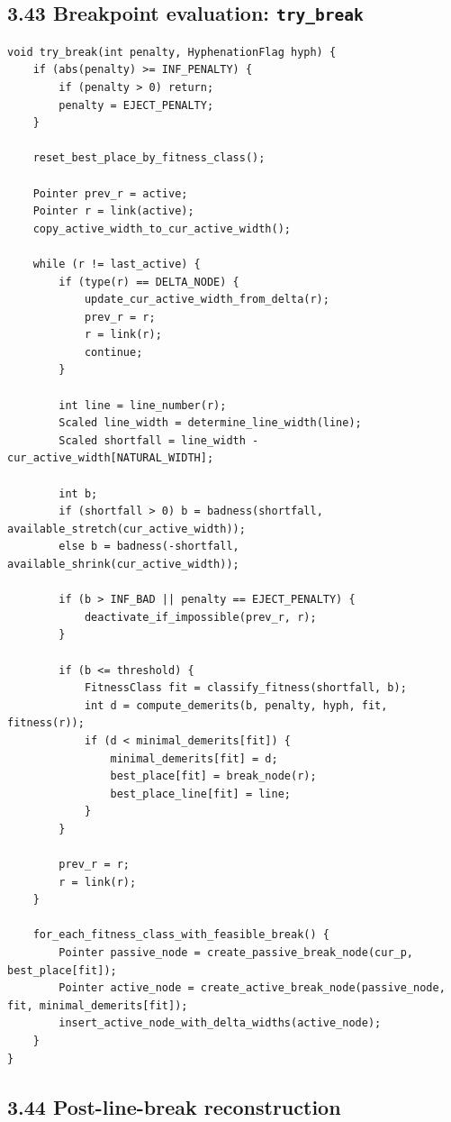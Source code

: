 \documentclass[11pt]{article}
\begin{document}
\subsection{\texorpdfstring{3.43 Breakpoint evaluation:
\texttt{try\_break}}{3.43 Breakpoint evaluation: try\_break}}\label{breakpoint-evaluation-try_break}

\begin{verbatim}
void try_break(int penalty, HyphenationFlag hyph) {
    if (abs(penalty) >= INF_PENALTY) {
        if (penalty > 0) return;
        penalty = EJECT_PENALTY;
    }

    reset_best_place_by_fitness_class();

    Pointer prev_r = active;
    Pointer r = link(active);
    copy_active_width_to_cur_active_width();

    while (r != last_active) {
        if (type(r) == DELTA_NODE) {
            update_cur_active_width_from_delta(r);
            prev_r = r;
            r = link(r);
            continue;
        }

        int line = line_number(r);
        Scaled line_width = determine_line_width(line);
        Scaled shortfall = line_width - cur_active_width[NATURAL_WIDTH];

        int b;
        if (shortfall > 0) b = badness(shortfall, available_stretch(cur_active_width));
        else b = badness(-shortfall, available_shrink(cur_active_width));

        if (b > INF_BAD || penalty == EJECT_PENALTY) {
            deactivate_if_impossible(prev_r, r);
        }

        if (b <= threshold) {
            FitnessClass fit = classify_fitness(shortfall, b);
            int d = compute_demerits(b, penalty, hyph, fit, fitness(r));
            if (d < minimal_demerits[fit]) {
                minimal_demerits[fit] = d;
                best_place[fit] = break_node(r);
                best_place_line[fit] = line;
            }
        }

        prev_r = r;
        r = link(r);
    }

    for_each_fitness_class_with_feasible_break() {
        Pointer passive_node = create_passive_break_node(cur_p, best_place[fit]);
        Pointer active_node = create_active_break_node(passive_node, fit, minimal_demerits[fit]);
        insert_active_node_with_delta_widths(active_node);
    }
}
\end{verbatim}

\subsection{3.44 Post-line-break
reconstruction}\label{post-line-break-reconstruction}
\end{document}
